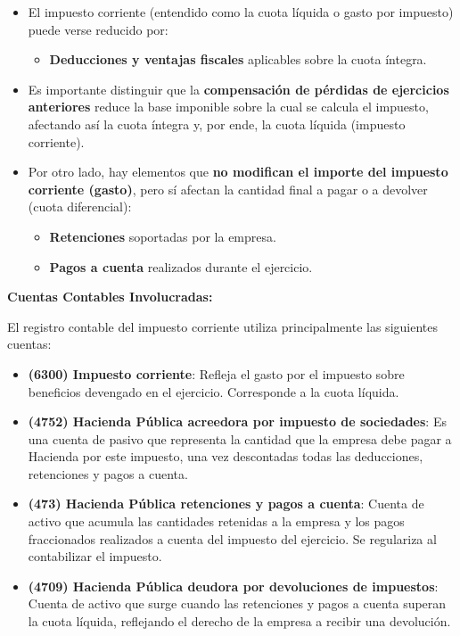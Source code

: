 \documentclass[
  paper=a4,
  ,captions=tableheading
]{scrbook}
\providecommand{\tightlist}{%
  \setlength{\itemsep}{0pt}\setlength{\parskip}{0pt}}
\begin{document}
\begin{itemize}
\tightlist
\item
  El impuesto corriente (entendido como la cuota líquida o gasto por
  impuesto) puede verse reducido por:

  \begin{itemize}
  \tightlist
  \item
    \textbf{Deducciones y ventajas fiscales} aplicables sobre la cuota
    íntegra.
  \end{itemize}
\item
  Es importante distinguir que la \textbf{compensación de pérdidas de
  ejercicios anteriores} reduce la base imponible sobre la cual se
  calcula el impuesto, afectando así la cuota íntegra y, por ende, la
  cuota líquida (impuesto corriente).
\item
  Por otro lado, hay elementos que \textbf{no modifican el importe del
  impuesto corriente (gasto)}, pero sí afectan la cantidad final a pagar
  o a devolver (cuota diferencial):

  \begin{itemize}
  \tightlist
  \item
    \textbf{Retenciones} soportadas por la empresa.
  \item
    \textbf{Pagos a cuenta} realizados durante el ejercicio.
  \end{itemize}
\end{itemize}

\textbf{Cuentas Contables Involucradas:}

El registro contable del impuesto corriente utiliza principalmente las
siguientes cuentas:

\begin{itemize}
\tightlist
\item
  \textbf{(6300) Impuesto corriente}: Refleja el gasto por el impuesto
  sobre beneficios devengado en el ejercicio. Corresponde a la cuota
  líquida.
\item
  \textbf{(4752) Hacienda Pública acreedora por impuesto de sociedades}:
  Es una cuenta de pasivo que representa la cantidad que la empresa debe
  pagar a Hacienda por este impuesto, una vez descontadas todas las
  deducciones, retenciones y pagos a cuenta.
\item
  \textbf{(473) Hacienda Pública retenciones y pagos a cuenta}: Cuenta
  de activo que acumula las cantidades retenidas a la empresa y los
  pagos fraccionados realizados a cuenta del impuesto del ejercicio. Se
  regulariza al contabilizar el impuesto.
\item
  \textbf{(4709) Hacienda Pública deudora por devoluciones de
  impuestos}: Cuenta de activo que surge cuando las retenciones y pagos
  a cuenta superan la cuota líquida, reflejando el derecho de la empresa
  a recibir una devolución.
\end{itemize}
\end{document}
